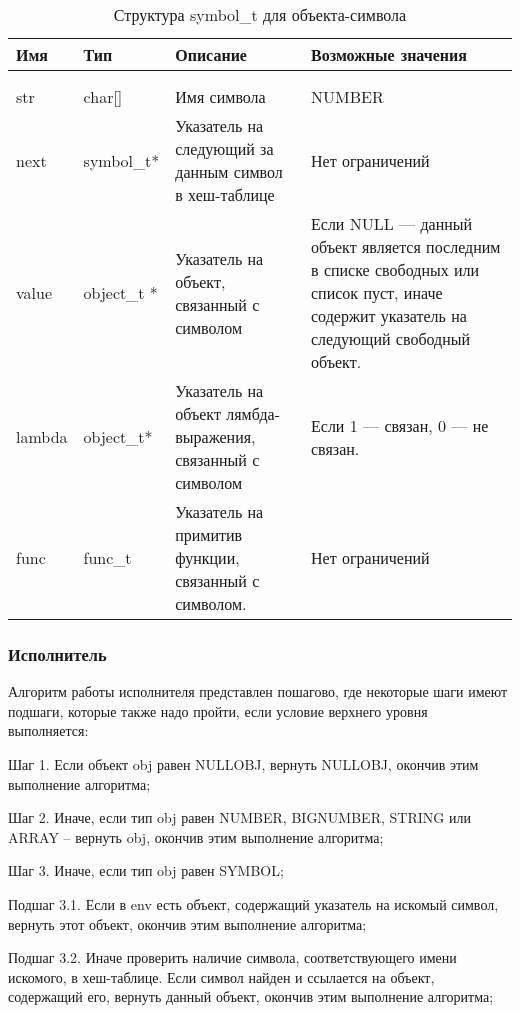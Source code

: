 \begin{xltabular}{\textwidth}{|l|l|p{5.7cm}|X|}
	\caption{Структура symbol\_t для объекта-символа\label{strobjsym:table}}\\ \hline
	\centrow Имя & \centrow Тип & \centrow Описание & \centrow Возможные значения \\ \hline
	 &  &  &  \\ \hline
	\endfirsthead
	 &  &  &  \\ \hline
	\finishhead
	str & char[] & Имя символа & NUMBER \\ \hline 
	next & symbol\_t* & Указатель на следующий за данным символ в хеш-таблице & Нет ограничений \\ \hline 
	value & object\_t * & Указатель на объект, связанный с символом & Если NULL — данный объект является последним в списке свободных или список пуст, иначе содержит указатель на следующий свободный объект. \\ \hline 
	lambda & object\_t* & Указатель на объект лямбда-выражения, связанный с символом & Если 1 — связан, 0 — не связан. \\ \hline
	func & func\_t & Указатель на примитив функции, связанный с символом. & Нет ограничений
\end{xltabular}


\subsubsection{Исполнитель}

Алгоритм работы исполнителя представлен пошагово, где некоторые шаги имеют подшаги, которые также надо пройти, если условие верхнего уровня выполняется:

Шаг 1. Если объект obj равен NULLOBJ, вернуть NULLOBJ, окончив этим выполнение алгоритма;

Шаг 2. Иначе, если тип obj равен NUMBER, BIGNUMBER, STRING или ARRAY -- вернуть obj, окончив этим выполнение алгоритма;

Шаг 3. Иначе, если тип obj равен SYMBOL;

Подшаг 3.1. Если в env есть объект, содержащий указатель на искомый символ, вернуть этот объект, окончив этим выполнение алгоритма;

Подшаг 3.2. Иначе проверить наличие символа, соответствующего имени искомого, в хеш-таблице. Если символ найден и ссылается на объект, содержащий его, вернуть данный объект, окончив этим выполнение алгоритма;

